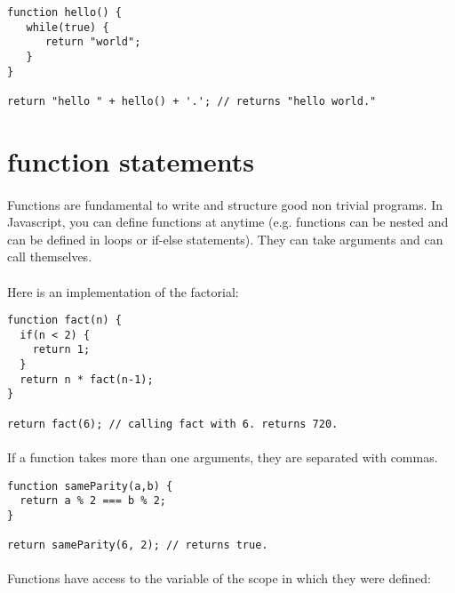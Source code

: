 \documentclass{article}
\begin{document}
\begin{sloppypar}
{\begin{lstlisting}
function hello() {
   while(true) {
      return "world";
   }
}

return "hello " + hello() + '.'; // returns "hello world."
\end{lstlisting}
}

   




\section{ function statements}


\paragraph{}
Functions are fundamental to write and structure good non trivial programs. In Javascript, you can define functions at anytime (e.g. functions can be nested and can be defined in loops or if-else statements). They can take arguments and can call themselves.
   
   
\paragraph{}
Here is an implementation of the factorial:
{\begin{lstlisting}
function fact(n) {
  if(n < 2) {
    return 1;
  }
  return n * fact(n-1);
}

return fact(6); // calling fact with 6. returns 720.
\end{lstlisting}
}


   
\paragraph{}
If a function takes more than one arguments, they are separated with commas.

{\begin{lstlisting}
function sameParity(a,b) {
  return a % 2 === b % 2;
}

return sameParity(6, 2); // returns true.
\end{lstlisting}
}


   
\paragraph{}
Functions have access to the variable of the scope in which they were defined:
   

\end{sloppypar}
\end{document}
